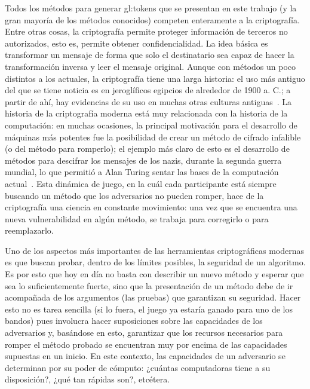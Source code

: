 Todos los métodos para generar \glspl{gl:token} que se presentan en este trabajo
(y la gran mayoría de los métodos conocidos) competen enteramente a la
criptografía. Entre otras cosas, la criptografía permite proteger información de
terceros no autorizados, esto es, permite obtener confidencialidad. La idea
básica es transformar un mensaje de forma que solo el destinatario sea capaz
de hacer la transformación inversa y leer el mensaje original. Aunque con
métodos un poco distintos a los actuales, la criptografía tiene una larga
historia: el uso más antiguo del que se tiene noticia es en jeroglíficos
egipcios de alrededor de 1900 a. C.; a partir de ahí, hay evidencias de su uso
en muchas otras culturas antiguas~\cite{codebreakers}. La historia de la
criptografía moderna está muy relacionada con la historia de la computación: en
muchas ocasiones, la principal motivación para el desarrollo de máquinas más
potentes fue la posibilidad de crear un método de cifrado infalible (o del
método para romperlo); el ejemplo más claro de esto es el desarrollo de
métodos para descifrar los mensajes de los nazis, durante la segunda guerra
mundial, lo que permitió a Alan Turing sentar las bases de la computación
actual~\cite{simon_singht}. Esta dinámica de juego, en la cuál cada participante
está siempre buscando un método que los adversarios no pueden romper,
hace de la criptografía una ciencia en constante movimiento: una vez que
se encuentra una nueva vulnerabilidad en algún método, se trabaja para
corregirlo o para reemplazarlo.

Uno de los aspectos más importantes de las herramientas criptográficas
modernas es que buscan probar, dentro de los límites posibles, la
seguridad de un algoritmo. Es por esto que hoy en día no basta con
describir un nuevo método y esperar que sea lo suficientemente fuerte,
sino que la presentación de un método debe de ir acompañada de los
argumentos (las pruebas) que garantizan su seguridad. Hacer esto no es
tarea sencilla (si lo fuera, el juego ya estaría ganado para uno de los
bandos) pues involucra hacer suposiciones sobre las capacidades de
los adversarios y, basándose en esto, garantizar que los recursos necesarios
para romper el método probado se encuentran muy por encima de las capacidades
supuestas en un inicio. En este contexto, las capacidades de un adversario
se determinan por su poder de cómputo: ¿cuántas computadoras tiene a su
disposición?, ¿qué tan rápidas son?, etcétera.

